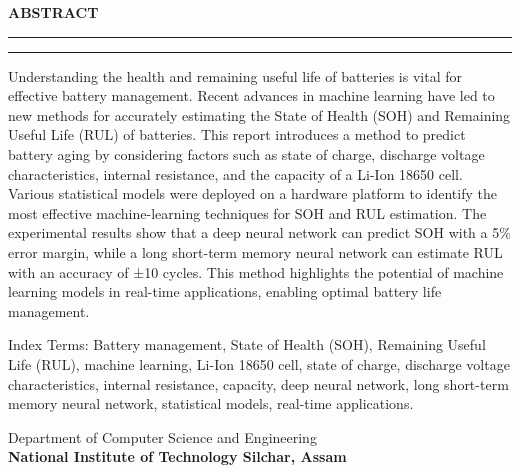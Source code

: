 \newpage
\thispagestyle{empty}

\begin{center}
\textbf{\LARGE{ABSTRACT}}
\vspace{.1in}\hrule
\vspace{.05in}\hrule
\vspace{.4in}
\end{center}

\begin{justifying}
Understanding the health and remaining useful life of batteries is vital for effective battery management. Recent advances in machine learning have led to new methods for accurately estimating the State of Health (SOH) and Remaining Useful Life (RUL) of batteries. This report introduces a method to predict battery aging by considering factors such as state of charge, discharge voltage characteristics, internal resistance, and the capacity of a Li-Ion 18650 cell. Various statistical models were deployed on a hardware platform to identify the most effective machine-learning techniques for SOH and RUL estimation. The experimental results show that a deep neural network can predict SOH with a 5\% error margin, while a long short-term memory neural network can estimate RUL with an accuracy of ±10 cycles. This method highlights the potential of machine learning models in real-time applications, enabling optimal battery life management. 

\vspace{0.4in}

Index Terms: Battery management, State of Health (SOH), Remaining Useful Life (RUL), machine learning, Li-Ion 18650 cell, state of charge, discharge voltage characteristics, internal resistance, capacity, deep neural network, long short-term memory neural network, statistical models, real-time applications.
\end{justifying}


\begin{center}
\vspace{2.8in}
Department of Computer Science and Engineering\\
\textbf{National Institute of Technology Silchar, Assam}
\end{center}
